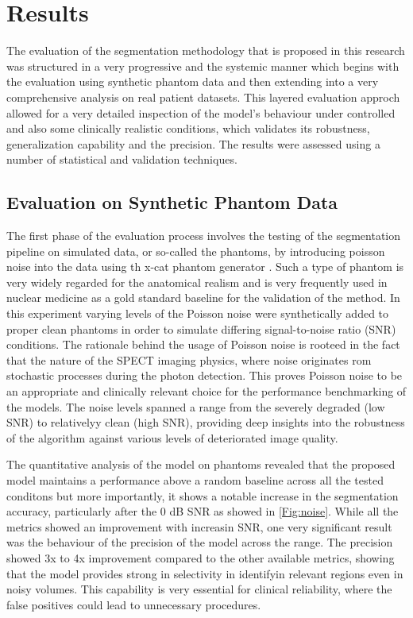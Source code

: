 \chapter{Results}
\label{ch:results}

The evaluation of the segmentation methodology that is proposed in this research was structured in a very progressive and the systemic manner which begins with the evaluation using synthetic phantom data and then extending into a very comprehensive analysis on real patient datasets. This layered evaluation approch allowed for a very detailed inspection of the model's behaviour under controlled and also some clinically realistic conditions, which validates its robustness, generalization capability and the precision. The results were  assessed using a number of statistical and validation techniques.

\section{Evaluation on Synthetic Phantom Data}
The first phase of the evaluation process involves the testing of the segmentation pipeline on simulated data, or so-called the phantoms, by introducing poisson noise into the data using th x-cat phantom generator \cite{xcat}. Such a type of phantom is very widely regarded for the anatomical realism and is very frequently used in nuclear medicine as a gold standard baseline for the validation of the method. In this experiment varying levels of the Poisson noise were synthetically added to proper clean phantoms in order to simulate differing signal-to-noise ratio (SNR) conditions. The rationale behind the usage of Poisson noise is rooteed in the fact that the nature of the SPECT imaging physics, where noise originates rom stochastic processes during the photon detection. This proves Poisson noise to be an appropriate and clinically relevant choice for the performance benchmarking of the models. The noise levels spanned a range from the severely degraded (low SNR) to relativelyy clean (high SNR), providing deep insights into the robustness of the algorithm against various levels of deteriorated image quality.

The quantitative analysis of the model on phantoms revealed that the proposed model maintains a performance above a random baseline across all the tested conditons but more importantly, it shows a notable increase in the segmentation accuracy, particularly after the 0 dB SNR as showed in \cref{Fig:noise}. While all the metrics showed an improvement with increasin SNR, one very significant result was the behaviour of the precision of the model across the range. The precision showed 3x to 4x improvement compared to the other available metrics, showing that the model provides strong in selectivity in identifyin relevant regions even in noisy volumes. This capability is very essential for clinical reliability, where the false positives could lead to unnecessary procedures.

